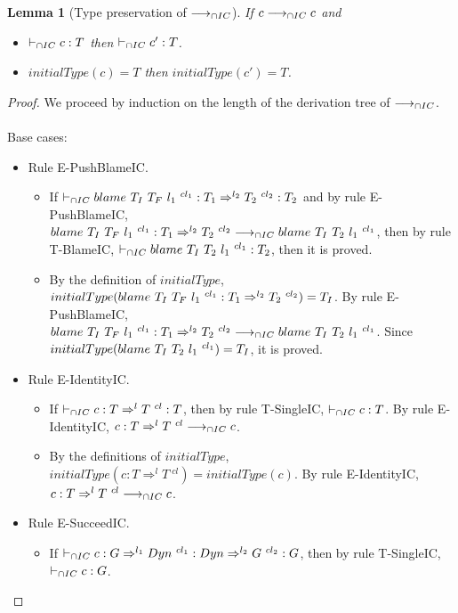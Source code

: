 \documentclass[a4paper]{article}
\newtheorem{lemma}{Lemma}
\begin{document}
\begin{lemma}[Type preservation of $\longrightarrow_{\cap IC}$]
\label{type_preservationIC}
If $c \longrightarrow_{\cap IC} c$ and
\begin{itemize}
    \item $\vdash_{\cap IC} c : T$ then $\vdash_{\cap IC} c' : T$.
    \item $initialType(c) = T$ then $initialType(c') = T$.
\end{itemize}
\end{lemma}
\begin{proof}
We proceed by induction on the length of the derivation tree of $\longrightarrow_{\cap IC}$.\\\\
Base cases:
\begin{itemize}
    \item Rule E-PushBlameIC.
    \begin{itemize}
        \item If $\vdash_{\cap IC} blame\ T_I\ T_F\ l_1\ ^{cl_1} : T_1 \Rightarrow^{l_2} T_2\ ^{cl_2} : T_2$ and by rule E-PushBlameIC, $blame\ T_I\ T_F\ l_1\ ^{cl_1} : T_1 \Rightarrow^{l_2} T_2\ ^{cl_2} \longrightarrow_{\cap IC} blame\ T_I\ T_2\ l_1\ ^{cl_1}$, then by rule T-BlameIC, $\vdash_{\cap IC} blame\ T_I\ T_2\ l_1\ ^{cl_1} : T_2$, then it is proved.
        \item By the definition of $initialType$, $initialType(blame\ T_I\ T_F\ l_1\ ^{cl_1} : T_1 \Rightarrow^{l_2} T_2\ ^{cl_2}) = T_I$.
        By rule E-PushBlameIC, $blame\ T_I\ T_F\ l_1\ ^{cl_1} : T_1 \Rightarrow^{l_2} T_2\ ^{cl_2} \longrightarrow_{\cap IC} blame\ T_I\ T_2\ l_1\ ^{cl_1}$.
        Since $initialType(blame\ T_I\ T_2\ l_1\ ^{cl_1}) = T_I$, it is proved.
    \end{itemize}
    \item Rule E-IdentityIC.
    \begin{itemize}
        \item If $\vdash_{\cap IC} c : T \Rightarrow^l T\ ^{cl} : T$, then by rule T-SingleIC, $\vdash_{\cap IC} c : T$.
        By rule E-IdentityIC, $c : T \Rightarrow^l T\ ^{cl} \icos c$.
        \item By the definitions of $initialType$, $initialType(c : T \Rightarrow^l T\ ^{cl}) = initialType(c)$.
        By rule E-IdentityIC, $c : T \Rightarrow^l T\ ^{cl} \icos c$.
    \end{itemize}
    \item Rule E-SucceedIC.
    \begin{itemize}
        \item If $\icts c : G \Rightarrow^{l_1} \Dyn\ ^{cl_1} : \Dyn \Rightarrow^{l_2} G\ ^{cl_2} : G$, then by rule T-SingleIC, $\vdash_{\cap IC} c : G$.

\end{itemize}
\end{itemize}
\end{proof}
\end{document}
